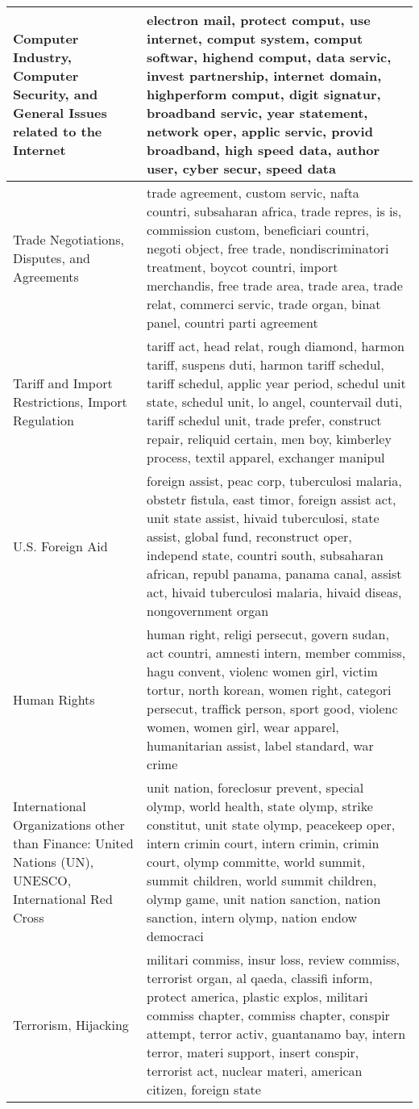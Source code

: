 \begin{longtable}{p{}p{}}
   \hline
Computer Industry, Computer Security, and General Issues related to the Internet & electron mail, protect comput, use internet, comput system, comput softwar, highend comput, data servic, invest partnership, internet domain, highperform comput, digit signatur, broadband servic, year statement, network oper, applic servic, provid broadband, high speed data, author user, cyber secur, speed data \\ 
   \hline
Trade Negotiations, Disputes, and Agreements & trade agreement, custom servic, nafta countri, subsaharan africa, trade repres, is is, commission custom, beneficiari countri, negoti object, free trade, nondiscriminatori treatment, boycot countri, import merchandis, free trade area, trade area, trade relat, commerci servic, trade organ, binat panel, countri parti agreement \\ 
   \hline
Tariff and Import Restrictions, Import Regulation & tariff act, head relat, rough diamond, harmon tariff, suspens duti, harmon tariff schedul, tariff schedul, applic year period, schedul unit state, schedul unit, lo angel, countervail duti, tariff schedul unit, trade prefer, construct repair, reliquid certain, men boy, kimberley process, textil apparel, exchanger manipul \\ 
   \hline
U.S. Foreign Aid & foreign assist, peac corp, tuberculosi malaria, obstetr fistula, east timor, foreign assist act, unit state assist, hivaid tuberculosi, state assist, global fund, reconstruct oper, independ state, countri south, subsaharan african, republ panama, panama canal, assist act, hivaid tuberculosi malaria, hivaid diseas, nongovernment organ \\ 
   \hline
Human Rights & human right, religi persecut, govern sudan, act countri, amnesti intern, member commiss, hagu convent, violenc women girl, victim tortur, north korean, women right, categori persecut, traffick person, sport good, violenc women, women girl, wear apparel, humanitarian assist, label standard, war crime \\ 
   \hline
International Organizations other than Finance: United Nations (UN), UNESCO, International Red Cross & unit nation, foreclosur prevent, special olymp, world health, state olymp, strike constitut, unit state olymp, peacekeep oper, intern crimin court, intern crimin, crimin court, olymp committe, world summit, summit children, world summit children, olymp game, unit nation sanction, nation sanction, intern olymp, nation endow democraci \\ 
   \hline
Terrorism, Hijacking & militari commiss, insur loss, review commiss, terrorist organ, al qaeda, classifi inform, protect america, plastic explos, militari commiss chapter, commiss chapter, conspir attempt, terror activ, guantanamo bay, intern terror, materi support, insert conspir, terrorist act, nuclear materi, american citizen, foreign state \\ 

\end{longtable}
